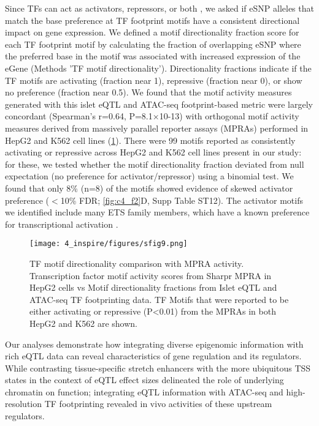 Since TFs can act as activators, repressors, or both \cite{ernstGenomescaleHighresolutionMapping2016}, we asked if eSNP alleles that match the base preference at TF footprint motifs have a consistent directional impact on gene expression. We defined a motif directionality fraction score for each TF footprint motif by calculating the fraction of overlapping eSNP where the preferred base in the motif was associated with increased expression of the eGene (Methods 'TF motif directionality'). Directionality fractions indicate if the TF motifs are activating (fraction near 1), repressive (fraction near 0), or show no preference (fraction near 0.5). We found that the motif activity measures generated with this islet eQTL and ATAC-seq footprint-based metric were largely concordant (Spearman's r=0.64, P=8.1×10-13) with orthogonal motif activity measures derived from massively parallel reporter assays (MPRAs) performed in HepG2 and K562 cell lines \cite{ernstGenomescaleHighresolutionMapping2016} (\ref{fig:c4_sf_mpra}). There were 99 motifs reported as consistently activating or repressive across HepG2 and K562 cell lines present in our study: for these, we tested whether the motif directionality fraction deviated from null expectation (no preference for activator/repressor) using a binomial test. We found that only 8\% (n=8) of the motifs showed evidence of skewed activator preference ($<$10\% FDR; \ref{fig:c4_f2}D, Supp Table ST12). The activator motifs we identified include many ETS family members, which have a known preference for transcriptional activation \cite{ernstGenomescaleHighresolutionMapping2016}. 

\begin{figure}
    \centering
    \texttt{[image: 4\_inspire/figures/sfig9.png]}
    \caption[TF motif directionality comparison with MPRA activity]{TF motif directionality comparison with MPRA activity. Transcription factor motif activity scores from Sharpr MPRA in HepG2 cells \cite{ernstGenomescaleHighresolutionMapping2016} vs Motif directionality fractions from Islet eQTL and ATAC-seq TF footprinting data. TF Motifs that were reported to be either activating or repressive (P<0.01) from the MPRAs in both HepG2 and K562 are shown.}
    \label{fig:c4_sf_mpra}
\end{figure}


Our analyses demonstrate how integrating diverse epigenomic information with rich eQTL data can reveal characteristics of gene regulation and its regulators. While contrasting tissue-specific stretch enhancers with the more ubiquitous TSS states in the context of eQTL effect sizes delineated the role of underlying chromatin on function; integrating eQTL information with ATAC-seq and high-resolution TF footprinting revealed in vivo activities of these upstream regulators.  


